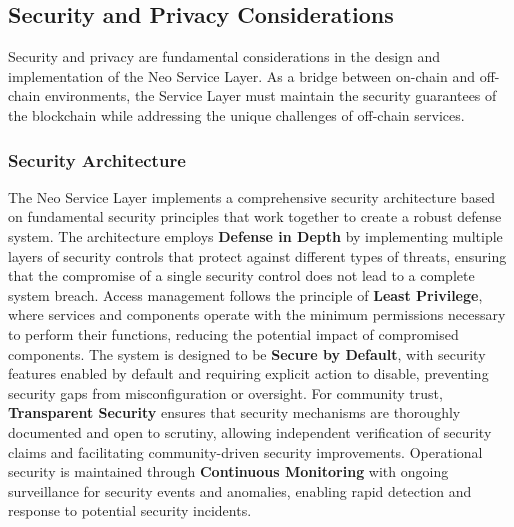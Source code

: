 \documentclass{article}
\begin{document}
\subsection{Security and Privacy Considerations}
\label{subsec:nsl-security}

Security and privacy are fundamental considerations in the design and implementation of the Neo Service Layer. As a bridge between on-chain and off-chain environments, the Service Layer must maintain the security guarantees of the blockchain while addressing the unique challenges of off-chain services.

\subsubsection{Security Architecture}
\label{subsubsec:security-architecture}

The Neo Service Layer implements a comprehensive security architecture based on fundamental security principles that work together to create a robust defense system. The architecture employs \textbf{Defense in Depth} by implementing multiple layers of security controls that protect against different types of threats, ensuring that the compromise of a single security control does not lead to a complete system breach. Access management follows the principle of \textbf{Least Privilege}, where services and components operate with the minimum permissions necessary to perform their functions, reducing the potential impact of compromised components. The system is designed to be \textbf{Secure by Default}, with security features enabled by default and requiring explicit action to disable, preventing security gaps from misconfiguration or oversight. For community trust, \textbf{Transparent Security} ensures that security mechanisms are thoroughly documented and open to scrutiny, allowing independent verification of security claims and facilitating community-driven security improvements. Operational security is maintained through \textbf{Continuous Monitoring} with ongoing surveillance for security events and anomalies, enabling rapid detection and response to potential security incidents.
\end{document}
